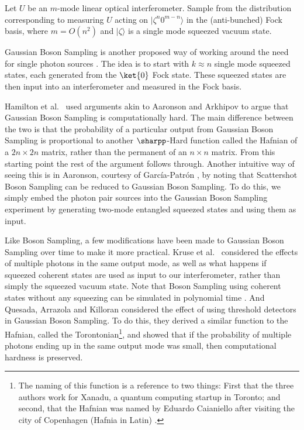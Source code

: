 \begin{problem} Let $U$ be an $m$-mode linear optical interferometer. Sample from the distribution corresponding to measuring $U$ acting on $|\zeta^n0^{m-n}\rangle$ in the (anti-bunched) Fock basis, where $m=O(n^2)$ and $|\zeta\rangle$ is a single mode squeezed vacuum state.
\end{problem}

Gaussian Boson Sampling is another proposed way of working around the need for single photon sources \cite{hamilton2017}. The idea is to start with $k\approx n$ single mode squeezed states, each generated from the $\ket{0}$ Fock state. These squeezed states are then input into an interferometer and measured in the Fock basis.

Hamilton et al.~\cite{hamilton2017} used arguments akin to Aaronson and Arkhipov to argue that Gaussian Boson Sampling is computationally hard. The main difference between the two is that the probability of a particular output from Gaussian Boson Sampling is proportional to another $\sharpp$-Hard function called the Hafnian of a $2n\times 2n$ matrix, rather than the permanent of an $n\times n$ matrix. From this starting point the rest of the argument follows through. Another intuitive way of seeing this is in Aaronson, courtesy of Garc\'{i}a-Patr\'{o}n \cite{aaronson2013}, by noting that Scattershot Boson Sampling can be reduced to Gaussian Boson Sampling. To do this, we simply embed the photon pair sources into the Gaussian Boson Sampling experiment by generating two-mode entangled squeezed states and using them as input.

Like Boson Sampling, a few modifications have been made to Gaussian Boson Sampling over time to make it more practical. Kruse et al.\ \cite{kruse2019} considered the effects of multiple photons in the same output mode, as well as what happens if squeezed coherent states are used as input to our interferometer, rather than simply the squeezed vacuum state. Note that Boson Sampling using coherent states without any squeezing can be simulated in polynomial time \cite{garciapatron2017}. And Quesada, Arrazola and Killoran \cite{quesada2018} considered the effect of using threshold detectors in Gaussian Boson Sampling. To do this, they derived a similar function to the Hafnian, called the Torontonian\footnote{The naming of this function is a reference to two things: First that the three authors work for Xanadu, a quantum computing startup in Toronto; and second, that the Hafnian was named by Eduardo Caianiello after visiting the city of Copenhagen (Hafnia in Latin) \cite{guerra2006}.}, and showed that if the probability of multiple photons ending up in the same output mode was small, then computational hardness is preserved.

